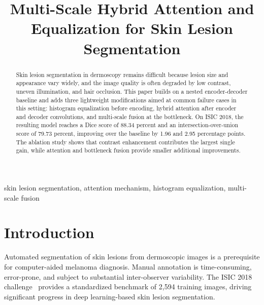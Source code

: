 \documentclass[conference]{IEEEtran}
\begin{document}
\title{Multi-Scale Hybrid Attention and Equalization for Skin Lesion Segmentation}

\author{
\and
{}
}

\maketitle

\begin{abstract}
Skin lesion segmentation in dermoscopy remains difficult because lesion size and appearance vary widely, and the image quality is often degraded by low contrast, uneven illumination, and hair occlusion. This paper builds on a nested encoder-decoder baseline and adds three lightweight modifications aimed at common failure cases in this setting: histogram equalization before encoding, hybrid attention after encoder and decoder convolutions, and multi-scale fusion at the bottleneck. On ISIC 2018, the resulting model reaches a Dice score of 88.34 percent and an intersection-over-union score of 79.73 percent, improving over the baseline by 1.96 and 2.95 percentage points. The ablation study shows that contrast enhancement contributes the largest single gain, while attention and bottleneck fusion provide smaller additional improvements.
\end{abstract}

\begin{IEEEkeywords}
skin lesion segmentation, attention mechanism, histogram equalization, multi-scale fusion
\end{IEEEkeywords}

\section{Introduction}

Automated segmentation of skin lesions from dermoscopic images is a prerequisite for computer-aided melanoma diagnosis. Manual annotation is time-consuming, error-prone, and subject to substantial inter-observer variability. The ISIC 2018 challenge~\cite{codella2018,tschandl2018} provides a standardized benchmark of 2,594 training images, driving significant progress in deep learning-based skin lesion segmentation.
\end{document}

